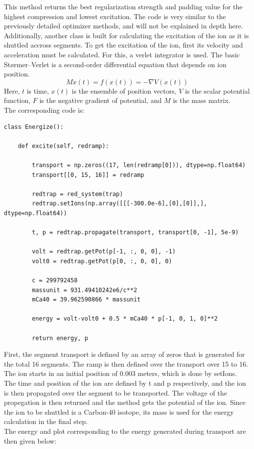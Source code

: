 \documentclass[11pt, a4paper]{article}
\theoremstyle{definition}
\numberwithin{equation}{section}
\begin{document}
This method returns the best regularization strength and padding value for the highest compression and lowest excitation. The code is very similar to the previously detailed optimizer methods, and will not be explained in depth here.
\\
Additionally, another class is built for calculating the excitation of the ion as it is shuttled accross segments.
To get the excitation of the ion, first its velocity and acceleration must be calculated. For this, a verlet integrator is used. The basic  Størmer–Verlet is a second-order differential equation that depends on ion position.
\begin{equation}
   M \ddot{x} (t) = f(x(t)) = - \nabla V(x(t))
\end{equation}
Here, $t$ is time, $x(t)$ is the ensemble of position vectors, $V$ is the scalar potential function, $F$ is the negative gradient of potential, and $M$ is the mass matrix.
\\
The corresponding code is:

\begin{verbatim}
class Energize():

    def excite(self, redramp):

        transport = np.zeros((17, len(redramp[0])), dtype=np.float64)
        transport[[0, 15, 16]] = redramp

        redtrap = red_system(trap)  
        redtrap.setIons(np.array([[[-300.0e-6],[0],[0]],], dtype=np.float64))

        t, p = redtrap.propagate(transport, transport[0, -1], 5e-9)

        volt = redtrap.getPot(p[-1, :, 0, 0], -1)
        volt0 = redtrap.getPot(p[0, :, 0, 0], 0)

        c = 299792458
        massunit = 931.49410242e6/c**2
        mCa40 = 39.962590866 * massunit

        energy = volt-volt0 + 0.5 * mCa40 * p[-1, 0, 1, 0]**2

        return energy, p
\end{verbatim}

First, the segment transport is defined by an array of zeros that is generated for the total 16 segments.
The ramp is then defined over the transport over 15 to 16. The ion starts in an initial position of 0.003 meters, which is done by setIons.
The time and position of the ion are defined by t and p respectively, and the ion is then propagated over the segment to be transported.
The voltage of the propegation is then returned and the method gets the potential of the ion.
Since the ion to be shuttled is a Carbon-40 isotope, its mass is used for the energy calculation in the final step.
\\
The energy and plot corresponding to the energy generated during transport are then given below:
\end{document}
